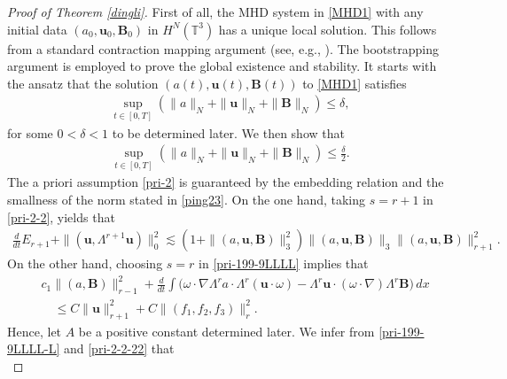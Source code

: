 \documentclass[10pt,a4paper]{amsart}
\def\T{ \mathbb{T} }
\def\b{ \mathbf{B} }
\def\u{ \mathbf{u} }
\begin{document}
\begin{proof}[Proof of Theorem \ref{dingli}]  First of all, the MHD system in \eqref{MHD1} with any
initial data $(a_0, \u_0,  \b_0)$ in $ H^N(\T^3)$ has a unique local solution.
This follows from a standard contraction mapping argument (see, e.g.,
\cite{MM}). The
bootstrapping argument is employed to prove the global existence and stability.
It starts with the ansatz that the solution $(a(t), \u(t),
\b(t))$ to \eqref{MHD1} satisfies
\begin{align}\label{ping23}
\sup_{t\in[0,T]}(\|a\|_{{N}}+\|\u\|_{{N}}+\|\b\|_{{N}})\le \delta,
\end{align}
for some $0<\delta<1$ to be determined later. We then show that
\begin{align*}%
\sup_{t\in[0,T]}(\|a\|_{{N}}+\|\u\|_{{N}}+\|\b\|_{{N}})\le \frac{\delta}{2}.
\end{align*}
The a priori assumption \eqref{pri-2} is guaranteed by the embedding relation and the smallness of the norm stated in \eqref{ping23}.
On the one hand, taking $s=r+1$ in \eqref{pri-2-2}, yields that
\begin{equation}\label{pri-2-2-22}
\begin{split}
\frac{d}{dt}E_{r+1}+\|(\u,\Lambda^{r+1}\u)\|_{0}^2
\lesssim(1+\|(a,\u,\b)\|^2_3)\|(a,\u,\b)\|_3\|(a,\u,\b)\|^2_{r+1}.
\end{split}\end{equation}
On the other hand,  choosing  $s=r$ in \eqref{pri-199-9LLLL} implies that
\begin{equation}
\begin{split}\label{pri-199-9LLLL-L}
&c_1\|(a,\b)\|_{r-1}^2+\frac{d}{dt}\int \Big(\omega\cdot\nabla\Lambda^{r}a\cdot\Lambda^{r}(\u\cdot\omega)-\Lambda^{r}\u\cdot(\omega\cdot\nabla)\Lambda^{r}\b\Big) \,dx\\&\quad\leq C\|\u\|_{r+1}^{2}+C\|(f_1,f_2,f_3)\|_{r}^{2}.
\end{split}
\end{equation}
Hence, let
 $A$ be a positive  constant determined later. We infer from \eqref{pri-199-9LLLL-L} and \eqref{pri-2-2-22} that
\begin{equation}\label{pri-2-2-22-2A}

\end{equation}
\end{proof}
\end{document}

